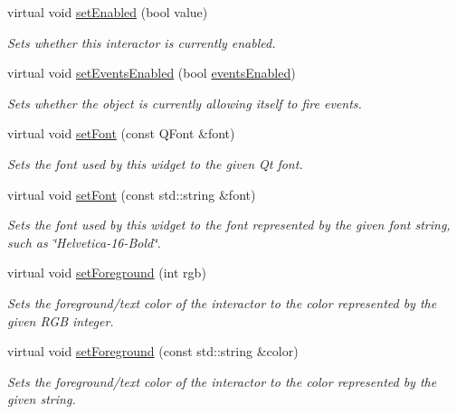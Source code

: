\begin{DoxyCompactItemize}
virtual void \mbox{\hyperlink{classGInteractor_ab831367dd84bbd579e02e55bacb21343}{set\+Enabled}} (bool value)
\begin{DoxyCompactList}\small\item\em Sets whether this interactor is currently enabled. \end{DoxyCompactList}\item 
virtual void \mbox{\hyperlink{classGObservable_afaa30b2a9e0f378fd1c70d2f1d0b8216}{set\+Events\+Enabled}} (bool \mbox{\hyperlink{classGInteractor_a597a370b592e3737d38d9d2f4e2031ea}{events\+Enabled}})
\begin{DoxyCompactList}\small\item\em Sets whether the object is currently allowing itself to fire events. \end{DoxyCompactList}\item 
virtual void \mbox{\hyperlink{classGInteractor_a2592348886ffea646c6534bf88f7c49d}{set\+Font}} (const Q\+Font \&font)
\begin{DoxyCompactList}\small\item\em Sets the font used by this widget to the given Qt font. \end{DoxyCompactList}\item 
virtual void \mbox{\hyperlink{classGInteractor_a8e096e8818d838aceae1d46d58fb3a7b}{set\+Font}} (const std\+::string \&font)
\begin{DoxyCompactList}\small\item\em Sets the font used by this widget to the font represented by the given font string, such as \char`\"{}\+Helvetica-\/16-\/\+Bold\char`\"{}. \end{DoxyCompactList}\item 
virtual void \mbox{\hyperlink{classGInteractor_a9eb856b5ff83a19df3831a31f15f4563}{set\+Foreground}} (int rgb)
\begin{DoxyCompactList}\small\item\em Sets the foreground/text color of the interactor to the color represented by the given R\+GB integer. \end{DoxyCompactList}\item 
virtual void \mbox{\hyperlink{classGInteractor_af59209aeadea6dfc6d97a2d8531f50e1}{set\+Foreground}} (const std\+::string \&color)
\begin{DoxyCompactList}\small\item\em Sets the foreground/text color of the interactor to the color represented by the given string. \end{DoxyCompactList}\item 

\end{DoxyCompactItemize}
